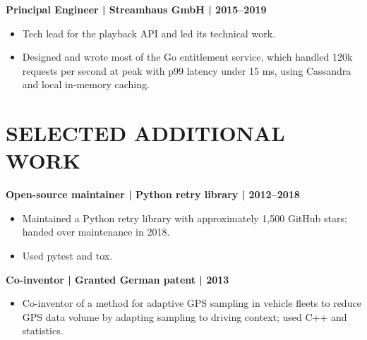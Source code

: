 \documentclass[11pt,a4paper]{article}
\begin{document}
\noindent\textbf{Principal Engineer | Streamhaus GmbH | 2015--2019}
\begin{itemize}
\item Tech lead for the playback API and led its technical work.
\item Designed and wrote most of the Go entitlement service, which handled 120k requests per second at peak with p99 latency under 15 ms, using Cassandra and local in-memory caching.
\end{itemize}

\section*{SELECTED ADDITIONAL WORK}
\noindent\textbf{Open-source maintainer | Python retry library | 2012--2018}
\begin{itemize}
\item Maintained a Python retry library with approximately 1,500 GitHub stars; handed over maintenance in 2018.
\item Used pytest and tox.
\end{itemize}

\noindent\textbf{Co-inventor | Granted German patent | 2013}
\begin{itemize}
\item Co-inventor of a method for adaptive GPS sampling in vehicle fleets to reduce GPS data volume by adapting sampling to driving context; used C++ and statistics.
\end{itemize}
\end{document}
